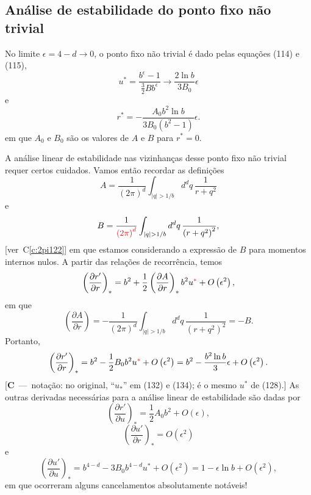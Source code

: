 \documentclass[12pt,a4paper]{article}
\newcommand{\corr}[1]{\textcolor{red}{#1}}
\newcounter{corr}
\newcommand{\nota}[2]{\refstepcounter{corr}\label{#1}%
  {\color{red}\small[\textbf{C\thecorr}~---~#2]}}
\newcommand{\ver}[1]{{\color{red}\small[ver~C\ref{#1}]}}
\begin{document}
\subsection{Análise de estabilidade do ponto fixo não trivial}

No limite $\epsilon=4-d\to0$, o ponto fixo não trivial é dado pelas equações (114)
e (115),
\begin{equation}
u^*=\frac{b^{\epsilon}-1}{\frac32Bb^{\epsilon}}\to\frac{2\ln b}{3B_0}\epsilon
\end{equation}
e
\begin{equation}
r^*=-\frac{A_0b^2\ln b}{3B_0\left(b^2-1\right)}\epsilon.
\end{equation}
em que $A_0$ e $B_0$ são os valores de $A$ e $B$ para $r^*=0$.

A análise linear de estabilidade nas vizinhanças desse ponto fixo não
trivial requer certos cuidados. Vamos então recordar as definições
\begin{equation}
A=\frac{1}{\left(2\pi\right)^d}\int_{|q|>1/b}d^dq\,\frac{1}{r+q^2}
\end{equation}
e
\begin{equation}
B=\frac{1}{\corr{\left(2\pi\right)^d}}\int_{|q|>1/b}d^dq\,\frac{1}{\left(r+q^2\right)^2},
\end{equation}
\ver{c:2pi122}
em que estamos considerando a expressão de $B$ para momentos internos
nulos. A partir das relações de recorrência, temos
\begin{equation}
\left(\frac{\partial r'}{\partial r}\right)_*=b^2+\frac12\left(\frac{\partial A}{\partial r}\right)_*b^2u^{\corr{*}}+O\left(\epsilon^2\right),
\end{equation}
em que
\begin{equation}
\left(\frac{\partial A}{\partial r}\right)=-\frac{1}{\left(2\pi\right)^d}\int_{|q|>1/b}d^dq\,\frac{1}{\left(r+q^2\right)^2}=-B.
\end{equation}
Portanto,
\begin{equation}
\left(\frac{\partial r'}{\partial r}\right)_*=b^2-\frac12B_0b^2u^{\corr{*}}+O\left(\epsilon^2\right)=b^2-\frac{b^2\ln b}{3}\epsilon+O\left(\epsilon^2\right).
\end{equation}
\nota{c:ustar}{notação: no original, ``$u_*$'' em (132) e (134); é o mesmo $u^*$ de (128).}
As outras derivadas necessárias para a análise linear de estabilidade são dadas
por
\begin{equation}
\left(\frac{\partial r'}{\partial u}\right)_*=\frac12A_0b^2+O\left(\epsilon\right),
\end{equation}
\begin{equation}
\left(\frac{\partial u'}{\partial r}\right)_*=O\left(\epsilon^2\right)
\end{equation}
e
\begin{equation}
\left(\frac{\partial u'}{\partial u}\right)_*=b^{4-d}-3B_0b^{4-d}u^*+O\left(\epsilon^2\right)=1-\epsilon\ln b+O\left(\epsilon^2\right),
\end{equation}
em que ocorreram alguns cancelamentos absolutamente notáveis!
\end{document}
